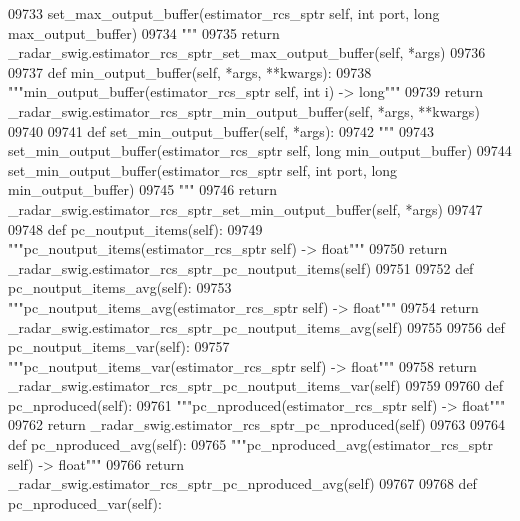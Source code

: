 \begin{DoxyCode}
{{{{{{{{{{{{{{{{{{{{{{{{{{{{{{{09733 \textcolor{stringliteral}{        set\_max\_output\_buffer(estimator\_rcs\_sptr self, int port, long max\_output\_buffer)}
09734 \textcolor{stringliteral}{        """}
09735         \textcolor{keywordflow}{return} \_radar\_swig.estimator\_rcs\_sptr\_set\_max\_output\_buffer(self, *args)
09736 
09737     \textcolor{keyword}{def }min_output_buffer(self, *args, **kwargs):
09738         \textcolor{stringliteral}{"""min\_output\_buffer(estimator\_rcs\_sptr self, int i) -> long"""}
09739         \textcolor{keywordflow}{return} \_radar\_swig.estimator\_rcs\_sptr\_min\_output\_buffer(self, *args, **kwargs)
09740 
09741     \textcolor{keyword}{def }set_min_output_buffer(self, *args):
09742         \textcolor{stringliteral}{"""}
09743 \textcolor{stringliteral}{        set\_min\_output\_buffer(estimator\_rcs\_sptr self, long min\_output\_buffer)}
09744 \textcolor{stringliteral}{        set\_min\_output\_buffer(estimator\_rcs\_sptr self, int port, long min\_output\_buffer)}
09745 \textcolor{stringliteral}{        """}
09746         \textcolor{keywordflow}{return} \_radar\_swig.estimator\_rcs\_sptr\_set\_min\_output\_buffer(self, *args)
09747 
09748     \textcolor{keyword}{def }pc_noutput_items(self):
09749         \textcolor{stringliteral}{"""pc\_noutput\_items(estimator\_rcs\_sptr self) -> float"""}
09750         \textcolor{keywordflow}{return} \_radar\_swig.estimator\_rcs\_sptr\_pc\_noutput\_items(self)
09751 
09752     \textcolor{keyword}{def }pc_noutput_items_avg(self):
09753         \textcolor{stringliteral}{"""pc\_noutput\_items\_avg(estimator\_rcs\_sptr self) -> float"""}
09754         \textcolor{keywordflow}{return} \_radar\_swig.estimator\_rcs\_sptr\_pc\_noutput\_items\_avg(self)
09755 
09756     \textcolor{keyword}{def }pc_noutput_items_var(self):
09757         \textcolor{stringliteral}{"""pc\_noutput\_items\_var(estimator\_rcs\_sptr self) -> float"""}
09758         \textcolor{keywordflow}{return} \_radar\_swig.estimator\_rcs\_sptr\_pc\_noutput\_items\_var(self)
09759 
09760     \textcolor{keyword}{def }pc_nproduced(self):
09761         \textcolor{stringliteral}{"""pc\_nproduced(estimator\_rcs\_sptr self) -> float"""}
09762         \textcolor{keywordflow}{return} \_radar\_swig.estimator\_rcs\_sptr\_pc\_nproduced(self)
09763 
09764     \textcolor{keyword}{def }pc_nproduced_avg(self):
09765         \textcolor{stringliteral}{"""pc\_nproduced\_avg(estimator\_rcs\_sptr self) -> float"""}
09766         \textcolor{keywordflow}{return} \_radar\_swig.estimator\_rcs\_sptr\_pc\_nproduced\_avg(self)
09767 
09768     \textcolor{keyword}{def }pc_nproduced_var(self):
}}}}}}}}}}}}}}}}}}}}}}}}}}}}}}}
\end{DoxyCode}
